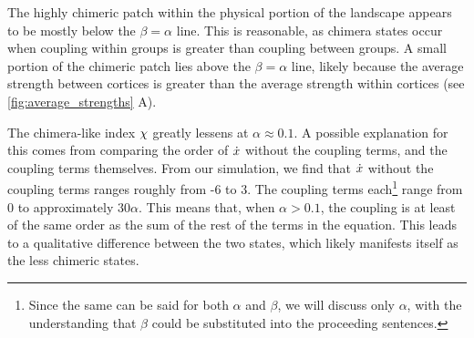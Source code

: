 The highly chimeric patch within the physical portion of the landscape appears to be mostly below the $\beta = \alpha$ line.
This is reasonable, as chimera states occur when coupling within groups is greater than coupling between groups.
A small portion of the chimeric patch lies above the $\beta = \alpha$ line, likely because the average strength between cortices is greater than the average strength within cortices (see \cref{fig:average_strengths} A).

The chimera-like index $\chi$ greatly lessens at $\alpha \approx 0.1$.
A possible explanation for this comes from comparing the order of $\dot{x}$ without the coupling terms, and the coupling terms themselves.
From our simulation, we find that $\dot{x}$ without the coupling terms ranges roughly from -6 to 3.
The coupling terms each\footnote{Since the same can be said for both $\alpha$ and $\beta$, we will discuss only $\alpha$, with the understanding that $\beta$ could be substituted into the proceeding sentences.}
range from 0 to approximately $30 \alpha$.
This means that, when $\alpha > 0.1$, the coupling is at least of the same order as the sum of the rest of the terms in the equation.
This leads to a qualitative difference between the two states, which likely manifests itself as the less chimeric states.

